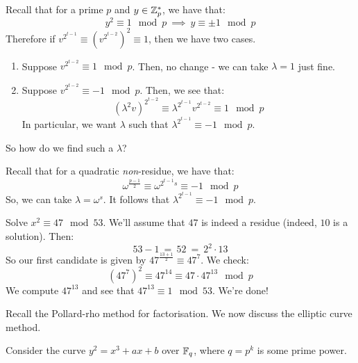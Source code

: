 \documentclass{article}
\begin{document}
Recall that for a prime $ p $ and $ y \in \mathbb{Z}_{p}^{*} $, we have that:
\begin{equation*}
    y^{2} \equiv 1 \mod p \ \implies \ y \equiv \pm 1 \mod p
\end{equation*}
Therefore if $ v^{2^{t-1}} \equiv \left( v^{2^{t-2}} \right)^{2} \equiv 1 $,
then we have two cases.
\begin{enumerate}
    \item Suppose $ v^{2^{t-2}} \equiv 1 \mod p $.
        Then, no change - we can take $ \lambda = 1 $ just fine.
    \item Suppose $ v^{2^{t-2}} \equiv -1 \mod p $. Then, we see that:
        \begin{equation*}
            (\lambda^{2} v)^{2^{t-2}} \equiv \lambda^{2^{t-1}}v^{2^{t-2}} \equiv 1 \mod p
        \end{equation*}
        In particular, we want $ \lambda $ such that $ \lambda^{2^{t-1}} \equiv -1 \mod p $.
\end{enumerate}
So how do we find such a $ \lambda $?

Recall that for a quadratic \textit{non}-residue, we have that:
\begin{equation*}
    \omega^{\frac{p-1}{2}} \equiv \omega^{2^{t-1}s} \equiv -1 \mod p
\end{equation*}
So, we can take $ \lambda = \omega^{s} $. It follows that $ \lambda^{2^{t-1}} \equiv -1 \mod p $.

\begin{xmp}[source=Primary Source Material]
    Solve $ x^{2} \equiv 47 \mod 53 $. \vsp
    We'll assume that $ 47 $ is indeed a residue (indeed, $ 10 $ is a solution).
    Then:
    \begin{equation*}
        53 - 1 \ = \ 52 \ = \ 2^{2}\cdot 13
    \end{equation*}
    So our first candidate is given by $ 47^{\frac{13+1}{2}} \equiv 47^{7} $. We check:
    \begin{equation*}
        (47^{7})^{2} \equiv 47^{14} \equiv 47 \cdot 47^{13} \mod p
    \end{equation*}
    We compute $ 47^{13} $ and see that $ 47^{13} \equiv 1 \mod 53 $. We're done!
\end{xmp}


Recall the Pollard-rho method for factorisation.
We now discuss the elliptic curve method.

Consider the curve $ y^{2} = x^{3} + ax + b $ over $ \mathbb{F}_{q} $,
where $ q = p^{k} $ is some prime power.
\end{document}
